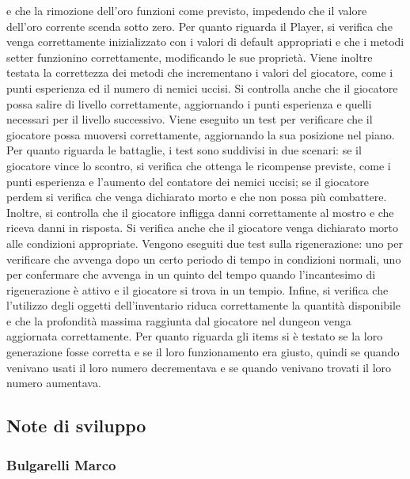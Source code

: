 \documentclass{report}
\begin{document}
%
e che la rimozione dell’oro funzioni come previsto, impedendo che il valore dell’oro corrente scenda sotto zero. \newline
%
Per quanto riguarda il Player, si verifica che venga correttamente inizializzato con i valori di default appropriati e che i metodi setter funzionino correttamente, modificando le sue proprietà.
%
Viene inoltre testata la correttezza dei metodi che incrementano i valori del giocatore, come i punti esperienza ed il numero di nemici uccisi. Si controlla anche che il giocatore possa salire di livello correttamente, 
%
aggiornando i punti esperienza e quelli necessari per il livello successivo. Viene eseguito un test per verificare che il giocatore possa muoversi correttamente, aggiornando la sua posizione nel piano. \newline
%
Per quanto riguarda le battaglie, i test sono suddivisi in due scenari: se il giocatore vince lo scontro, si verifica che ottenga le ricompense previste, come i punti esperienza e l’aumento del contatore dei nemici uccisi;
%
se il giocatore perdem si verifica che venga dichiarato morto e che non possa più combattere. Inoltre, si controlla che il giocatore infligga danni correttamente al mostro e che riceva danni in risposta. Si verifica anche 
%
che il giocatore venga dichiarato morto alle condizioni appropriate. \newline
%
Vengono eseguiti due test sulla rigenerazione: uno per verificare che avvenga dopo un certo periodo di tempo in condizioni normali, uno per confermare che avvenga in un quinto del tempo quando l’incantesimo di rigenerazione 
%
è attivo e il giocatore si trova in un tempio. \newline
%
Infine, si verifica che l’utilizzo degli oggetti dell’inventario riduca correttamente la quantità disponibile e che la profondità massima raggiunta dal giocatore nel dungeon venga aggiornata correttamente. \newline
%
Per quanto riguarda gli items si è testato se la loro generazione fosse corretta e se il loro funzionamento era giusto, quindi se quando venivano usati il loro numero decrementava e se quando venivano trovati il loro numero aumentava. \newline
%

\subsection{Note di sviluppo}

\subsubsection{Bulgarelli Marco}
\end{document}
